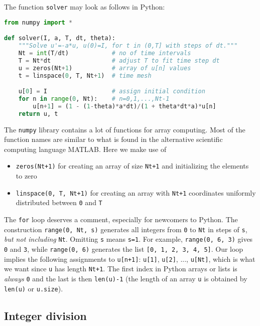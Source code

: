 \documentclass[graybox,sectrefs,envcountresetchap,open=right,final]{svmonodo}
\begin{document}
The function \texttt{solver} may look as follows in Python:

\begin{lstlisting}[language=Python,style=blue1_bluegreen]
from numpy import *

def solver(I, a, T, dt, theta):
    """Solve u'=-a*u, u(0)=I, for t in (0,T] with steps of dt."""
    Nt = int(T/dt)            # no of time intervals
    T = Nt*dt                 # adjust T to fit time step dt
    u = zeros(Nt+1)           # array of u[n] values
    t = linspace(0, T, Nt+1)  # time mesh

    u[0] = I                  # assign initial condition
    for n in range(0, Nt):    # n=0,1,...,Nt-1
        u[n+1] = (1 - (1-theta)*a*dt)/(1 + theta*dt*a)*u[n]
    return u, t
\end{lstlisting}

The \texttt{numpy} library contains a lot of functions for array computing. Most
of the function names are similar to what is found
in the alternative scientific computing language MATLAB. Here
we make use of

\begin{itemize}
 \item \texttt{zeros(Nt+1)} for creating an array of size \texttt{Nt+1}
   and initializing the elements to zero

 \item \texttt{linspace(0, T, Nt+1)} for creating an array with \texttt{Nt+1}
   coordinates uniformly distributed between \texttt{0} and \texttt{T}
\end{itemize}

\noindent
The \texttt{for} loop deserves a comment, especially for newcomers to Python.
The construction \texttt{range(0, Nt, s)} generates all integers from \texttt{0} to \texttt{Nt}
in steps of \texttt{s}, \emph{but not including} \texttt{Nt}. Omitting \texttt{s} means \texttt{s=1}.
For example, \texttt{range(0, 6, 3)}
gives \texttt{0} and \texttt{3}, while \texttt{range(0, 6)} generates
the list \texttt{[0, 1, 2, 3, 4, 5]}.
Our loop implies the following assignments to \texttt{u[n+1]}: \texttt{u[1]}, \texttt{u[2]}, ...,
\texttt{u[Nt]}, which is what we want since \texttt{u} has length \texttt{Nt+1}.
The first index in Python arrays or lists is \emph{always} \texttt{0} and the
last is then \texttt{len(u)-1} (the length of an array \texttt{u} is obtained by
\texttt{len(u)} or \texttt{u.size}).

\subsection{Integer division}
\label{decay:py2}
\end{document}
